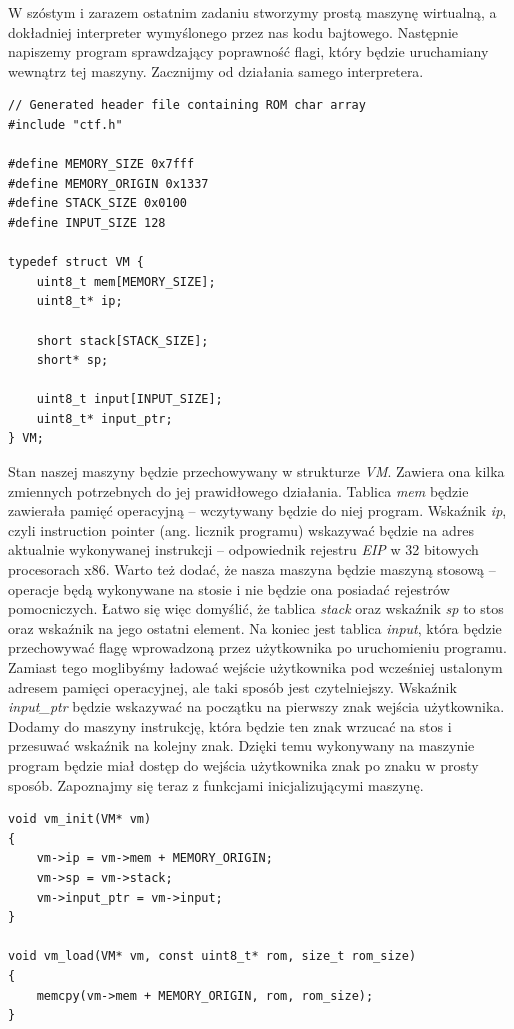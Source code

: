 \documentclass[language=polish,type=eng]{aghmodern}
\begin{document}
W szóstym i zarazem ostatnim zadaniu stworzymy prostą maszynę wirtualną, a dokładniej
interpreter wymyślonego przez nas kodu bajtowego. Następnie napiszemy program sprawdzający
poprawność flagi, który będzie uruchamiany wewnątrz tej maszyny. Zacznijmy od działania
samego interpretera.

\begin{verbatim}
// Generated header file containing ROM char array
#include "ctf.h"

#define MEMORY_SIZE 0x7fff
#define MEMORY_ORIGIN 0x1337
#define STACK_SIZE 0x0100
#define INPUT_SIZE 128

typedef struct VM {
    uint8_t mem[MEMORY_SIZE];
    uint8_t* ip;

    short stack[STACK_SIZE];
    short* sp;

    uint8_t input[INPUT_SIZE];
    uint8_t* input_ptr;
} VM;
\end{verbatim}

Stan naszej maszyny będzie przechowywany w strukturze \emph{VM}. Zawiera ona kilka zmiennych
potrzebnych do jej prawidłowego działania. Tablica \emph{mem} będzie zawierała pamięć operacyjną --
wczytywany będzie do niej program. Wskaźnik \emph{ip}, czyli instruction pointer (ang. licznik programu)
wskazywać będzie na adres aktualnie wykonywanej instrukcji -- odpowiednik rejestru \emph{EIP}
w 32 bitowych procesorach x86. Warto też dodać, że nasza maszyna będzie maszyną stosową
-- operacje będą wykonywane na stosie i nie będzie ona posiadać rejestrów pomocniczych.
Łatwo się więc domyślić, że tablica \emph{stack} oraz wskaźnik \emph{sp}
to stos oraz wskaźnik na jego ostatni element. Na koniec jest tablica \emph{input},
która będzie przechowywać flagę wprowadzoną przez użytkownika po uruchomieniu programu.
Zamiast tego moglibyśmy ładować wejście użytkownika pod wcześniej ustalonym adresem pamięci
operacyjnej, ale taki sposób jest czytelniejszy. Wskaźnik \emph{input\_ptr} będzie wskazywać
na początku na pierwszy znak wejścia użytkownika. Dodamy do maszyny instrukcję, która będzie ten
znak wrzucać na stos i przesuwać wskaźnik na kolejny znak. Dzięki temu wykonywany na maszynie
program będzie miał dostęp do wejścia użytkownika znak po znaku w prosty sposób.
Zapoznajmy się teraz z funkcjami inicjalizującymi maszynę.

\begin{verbatim}
void vm_init(VM* vm)
{
    vm->ip = vm->mem + MEMORY_ORIGIN;
    vm->sp = vm->stack;
    vm->input_ptr = vm->input;
}

void vm_load(VM* vm, const uint8_t* rom, size_t rom_size)
{
    memcpy(vm->mem + MEMORY_ORIGIN, rom, rom_size);
}
\end{verbatim}
\end{document}
